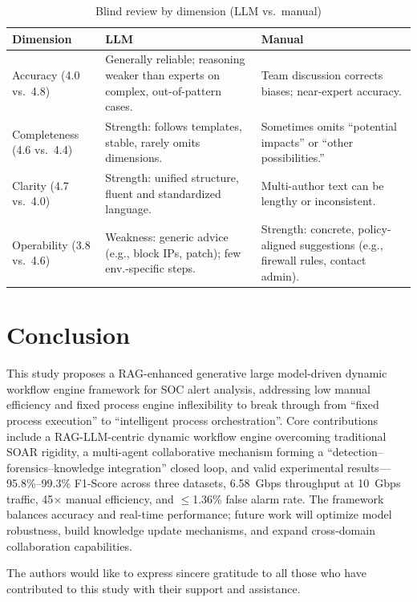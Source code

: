 \documentclass[sigconf,authordraft]{acmart}
\begin{document}
\begin{table}[htbp]
\centering
\caption{Blind review by dimension (LLM vs.\ manual)}
\small
\setlength{\tabcolsep}{5pt}
\begin{tabular}{@{}p{1.6cm}p{4.2cm}p{4.2cm}@{}}
\toprule
\textbf{Dimension} & \textbf{LLM} & \textbf{Manual} \\
\midrule
Accuracy (4.0 vs.\ 4.8) & Generally reliable; reasoning weaker than experts on complex, out-of-pattern cases. & Team discussion corrects biases; near-expert accuracy. \\
Completeness (4.6 vs.\ 4.4) & Strength: follows templates, stable, rarely omits dimensions. & Sometimes omits ``potential impacts'' or ``other possibilities.'' \\
Clarity (4.7 vs.\ 4.0) & Strength: unified structure, fluent and standardized language. & Multi-author text can be lengthy or inconsistent. \\
Operability (3.8 vs.\ 4.6) & Weakness: generic advice (e.g., block IPs, patch); few env.-specific steps. & Strength: concrete, policy-aligned suggestions (e.g., firewall rules, contact admin). \\
\bottomrule
\end{tabular}
\end{table}

\section{Conclusion}

This study proposes a RAG-enhanced generative large model-driven dynamic workflow engine framework for SOC alert analysis, addressing low manual efficiency and fixed process engine inflexibility to break through from ``fixed process execution'' to ``intelligent process orchestration''. Core contributions include a RAG-LLM-centric dynamic workflow engine overcoming traditional SOAR rigidity, a multi-agent collaborative mechanism forming a ``detection--forensics--knowledge integration'' closed loop, and valid experimental results---95.8\%--99.3\% F1-Score across three datasets, 6.58~Gbps throughput at 10~Gbps traffic, 45$\times$ manual efficiency, and $\leq$1.36\% false alarm rate. The framework balances accuracy and real-time performance; future work will optimize model robustness, build knowledge update mechanisms, and expand cross-domain collaboration capabilities.

\begin{acks}
The authors would like to express sincere gratitude to all those who have contributed to this study with their support and assistance.
\end{acks}
\end{document}
